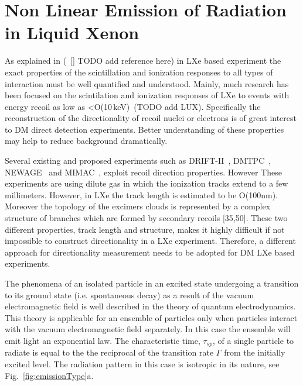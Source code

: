 \section{Non Linear Emission of Radiation in Liquid Xenon}
\label{sec:intro_superradiance}
As explained in (~\ref{} TODO add reference here) in LXe based experiment the exact properties of the scintillation and ionization responses to all types of interaction must be well quantified and understood. Mainly, much research has been focused on the scintilation and ionization responses of LXe to events with energy recoil as low as <O(10\,keV)~\cite{Manzur:2009hp,Aprile:2012an,Baudis:2013cca}(TODO add LUX).
Specifically the reconstruction of the directionality of recoil nuclei or electrons is of great interest to DM direct detection experiments. Better understanding of these properties may help to reduce background dramatically.

Several existing and proposed experiments such as DRIFT-II~\cite{Muna:2007zz}, DMTPC~\cite{Deaconu:2017vam}, NEWAGE~\cite{Yakabe:2016pjh} and MIMAC~\cite{Riffard:2016mgw}, exploit recoil direction properties. However These experiments are using dilute gas in which the ionization tracks extend to a few millimeters. However, in LXe the track length is estimated to be O(100nm). Moreover the topology of the excimers clouds is represented by a complex structure of branches which are formed by secondary recoils [35,50]. These two different properties, track length and structure, makes it highly difficult if not impossible to construct directionality in a LXe experiment. Therefore, a different approach for directionality measurement needs to be adopted for DM LXe based experiments.

The phenomena of an isolated particle in an excited state undergoing a transition to its ground state (i.e. spontaneous decay) as a result of the vacuum electromagnetic field  is well described in the theory of quantum electrodynamics. This theory is applicable for an ensemble of particles only when particles interact with the vacuum electromagnetic field separately. In this case the ensemble will emit light an exponential law. The characteristic time, $\tau_{sp}$, of a single particle to radiate is equal to the the reciprocal of the transition rate $\Gamma$ from the initially excited level. The radiation pattern in this case is isotropic in its nature, see Fig.~\ref{fig:emissionType}a. 

